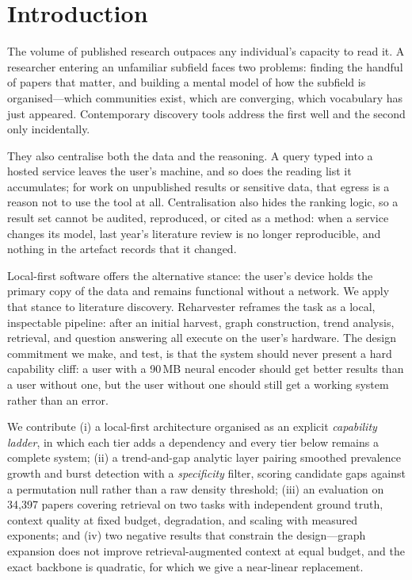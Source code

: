 \documentclass[runningheads]{llncs}
\begin{document}
\section{Introduction}
\label{sec:intro}

The volume of published research outpaces any individual's capacity to read it. A
researcher entering an unfamiliar subfield faces two problems: finding the handful of
papers that matter, and building a mental model of how the subfield is
organised---which communities exist, which are converging, which vocabulary has just
appeared. Contemporary discovery tools address the first well and the second only
incidentally.

They also centralise both the data and the reasoning. A query typed into a hosted
service leaves the user's machine, and so does the reading list it accumulates; for
work on unpublished results or sensitive data, that egress is a reason not to use the
tool at all. Centralisation also hides the ranking logic, so a result set cannot be
audited, reproduced, or cited as a method: when a service changes its model, last
year's literature review is no longer reproducible, and nothing in the artefact records
that it changed.

Local-first software \cite{kleppmann2019} offers the alternative stance: the user's
device holds the primary copy of the data and remains functional without a network. We
apply that stance to literature discovery. Reharvester reframes the task as a local,
inspectable pipeline: after an initial harvest, graph construction, trend analysis,
retrieval, and question answering all execute on the user's hardware. The design commitment we make,
and test, is that the system should never present a hard capability cliff: a user with
a 90\,MB neural encoder should get better results than a user without one, but the
user without one should still get a working system rather than an error.

We contribute (i) a local-first architecture organised as an explicit \emph{capability
ladder}, in which each tier adds a dependency and every tier below remains a complete
system; (ii) a trend-and-gap analytic layer pairing smoothed prevalence growth and burst
detection with a \emph{specificity} filter, scoring candidate gaps against a permutation
null rather than a raw density threshold; (iii) an evaluation on 34{,}397 papers covering
retrieval on two tasks with independent ground truth, context quality at fixed budget,
degradation, and scaling with measured exponents; and (iv) two negative results that
constrain the design---graph expansion does not improve retrieval-augmented context at
equal budget, and the exact backbone is quadratic, for which we give a near-linear
replacement.
\end{document}

